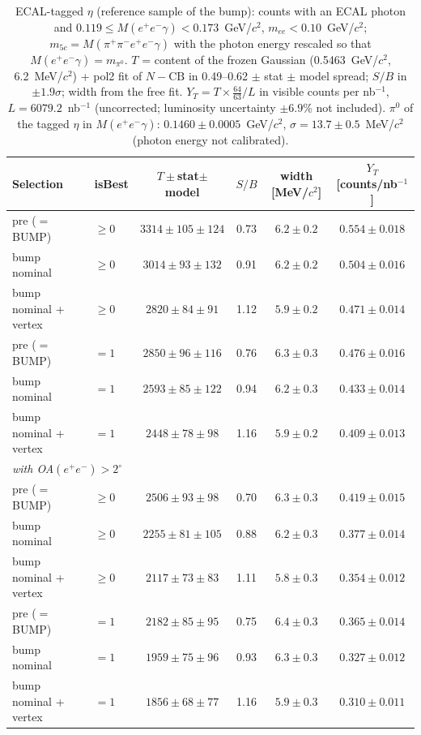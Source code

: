 \begin{table}[H]
\centering\small
\setlength{\tabcolsep}{4pt}
\caption{ECAL-tagged $\eta$ (reference sample of the bump): counts with an ECAL photon and $0.119\leq M(e^+e^-\gamma)<0.173$~GeV/$c^2$, $m_{ee}<0.10$~GeV/$c^2$; $m_{5c}=M(\pi^+\pi^-e^+e^-\gamma)$ with the photon energy rescaled so that $M(e^+e^-\gamma)=m_{\pi^0}$. $T$ = content of the frozen Gaussian (0.5463~GeV/$c^2$, 6.2~MeV/$c^2$) + pol2 fit of $N-\mathrm{CB}$ in 0.49--0.62 $\pm$ stat $\pm$ model spread; $S/B$ in $\pm1.9\sigma$; width from the free fit. $Y_T=T\times\frac{64}{63}/L$ in visible counts per nb$^{-1}$, $L=6079.2$~nb$^{-1}$ (uncorrected; luminosity uncertainty $\pm6.9$\% not included). $\pi^0$ of the tagged $\eta$ in $M(e^+e^-\gamma)$: $0.1460\pm0.0005$~GeV/$c^2$, $\sigma=13.7\pm0.5$~MeV/$c^2$ (photon energy not calibrated).}
\label{tab:res_tagged}
\begin{tabular}{llcccc}
\toprule
Selection & isBest & $T\pm$stat$\pm$model & $S/B$ & width [MeV/$c^2$] & $Y_T$ [counts/nb$^{-1}$] \\
\midrule
pre ($=$ BUMP) & $\geq0$ & $3314\pm105\pm124$ & 0.73 & $6.2\pm0.2$ & $0.554\pm0.018$ \\
bump nominal & $\geq0$ & $3014\pm93\pm132$ & 0.91 & $6.2\pm0.2$ & $0.504\pm0.016$ \\
bump nominal + vertex & $\geq0$ & $2820\pm84\pm91$ & 1.12 & $5.9\pm0.2$ & $0.471\pm0.014$ \\
pre ($=$ BUMP) & $=1$ & $2850\pm96\pm116$ & 0.76 & $6.3\pm0.3$ & $0.476\pm0.016$ \\
bump nominal & $=1$ & $2593\pm85\pm122$ & 0.94 & $6.2\pm0.3$ & $0.433\pm0.014$ \\
bump nominal + vertex & $=1$ & $2448\pm78\pm98$ & 1.16 & $5.9\pm0.2$ & $0.409\pm0.013$ \\
\midrule
\multicolumn{6}{l}{\emph{with OA$(e^+e^-)>2^\circ$}} \\
pre ($=$ BUMP) & $\geq0$ & $2506\pm93\pm98$ & 0.70 & $6.3\pm0.3$ & $0.419\pm0.015$ \\
bump nominal & $\geq0$ & $2255\pm81\pm105$ & 0.88 & $6.2\pm0.3$ & $0.377\pm0.014$ \\
bump nominal + vertex & $\geq0$ & $2117\pm73\pm83$ & 1.11 & $5.8\pm0.3$ & $0.354\pm0.012$ \\
pre ($=$ BUMP) & $=1$ & $2182\pm85\pm95$ & 0.75 & $6.4\pm0.3$ & $0.365\pm0.014$ \\
bump nominal & $=1$ & $1959\pm75\pm96$ & 0.93 & $6.3\pm0.3$ & $0.327\pm0.012$ \\
bump nominal + vertex & $=1$ & $1856\pm68\pm77$ & 1.16 & $5.9\pm0.3$ & $0.310\pm0.011$ \\
\bottomrule
\end{tabular}
\end{table}
